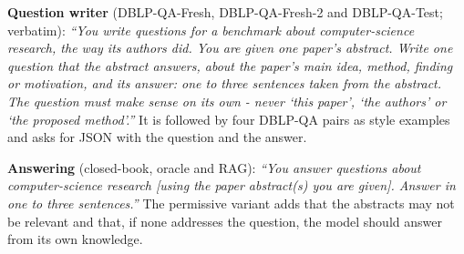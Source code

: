 \documentclass[conference]{IEEEtran}
\newcommand{\dq}{DBLP-QA}
\newcommand{\fresh}{DBLP-QA-Fresh}
\newcommand{\freshb}{DBLP-QA-Fresh-2}
\newcommand{\test}{DBLP-QA-Test}
\begin{document}
\textbf{Question writer} (\fresh{}, \freshb{} and \test{}; verbatim): \emph{``You write questions for a
benchmark about computer-science research, the way its authors did. You are given one paper's abstract.
Write one question that the abstract answers, about the paper's main idea, method, finding or motivation,
and its answer: one to three sentences taken from the abstract. The question must make sense on its own
- never `this paper', `the authors' or `the proposed method'.''} It is followed by four \dq{} pairs as
style examples and asks for JSON with the question and the answer.

\textbf{Answering} (closed-book, oracle and RAG): \emph{``You answer questions about computer-science
research [using the paper abstract(s) you are given]. Answer in one to three sentences.''} The permissive
variant adds that the abstracts may not be relevant and that, if none addresses the question, the model
should answer from its own knowledge.
\end{document}

